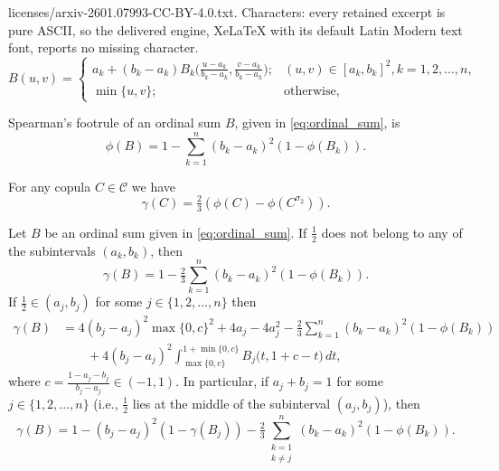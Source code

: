 \documentclass[10pt,a4paper]{amsart}
\newcommand{\CC}{\mathcal{C}}
\begin{document}
licenses/arxiv-2601.07993-CC-BY-4.0.txt. Characters: every retained excerpt is pure ASCII, so the delivered engine, XeLaTeX with its default Latin Modern text font, reports no missing character.
\begin{equation} \label{eq:ordinal_sum}
B(u, v) = \begin{cases}
		a_k + (b_k-a_k)B_k\big(\frac{u-a_k}{b_k-a_k}, \frac{v-a_k}{b_k-a_k}\big); & (u, v) \in [a_k, b_k]^2, k=1, 2, \dots, n,\\
			\min\{u,v\}; & \text{otherwise},
    \end{cases}
\end{equation}

\begin{proposition}\label{prop:ordinal-phi}
   Spearman's footrule of an ordinal sum $B$, given in \eqref{eq:ordinal_sum}, is
    \begin{equation} \label{eq:ordinal-phi}
        \phi(B) =  1 - \sum_{k=1}^n (b_k-a_k)^2(1-\phi(B_k)). 
    \end{equation}  
\end{proposition}

\begin{lemma} \label{lem:gamma-phi}
For any copula $C \in \CC$ we have 
$$\gamma(C) = \tfrac23 (\phi(C)-\phi(C^{\sigma_2})).$$
\end{lemma}

\begin{proposition}\label{prop:ordinal-gamma}
Let $B$ be an ordinal sum given in \eqref{eq:ordinal_sum}. If $\tfrac12$ does not belong to any of the subintervals $(a_k, b_k)$, then 
\begin{equation} \label{eq:ordinal-gamma-1}
        \gamma(B) =  1 - \tfrac23\sum_{k=1}^n (b_k-a_k)^2(1-\phi(B_k)). 
\end{equation}  
If $\tfrac12 \in (a_j, b_j)$ for some $j \in \{1, 2, ..., n\}$ then
\begin{align*}
   \gamma(B) &= 4(b_j-a_j)^2\max\{0,c\}^2 + 4a_j - 4a_j^2 - \tfrac23\sum_{k=1}^n (b_k-a_k)^2(1-\phi(B_k)) \\
   &\qquad+ 4(b_j-a_j)^2\int_{\max\{0,c\}}^{1+\min\{0,c\}} B_j\big(t,1+c-t\big) \, dt,
\end{align*}
where $c=\frac{1-a_j-b_j}{b_j-a_j} \in (-1,1)$.
In particular, if $a_j + b_j = 1$ for some $j \in \{1, 2, ..., n\}$ (i.e., $\tfrac12$ lies at the middle of the subinterval $(a_j, b_j)$), then
\begin{equation} \label{eq:ordinal-gamma-3}
        \gamma(B) =  1 - (b_j-a_j)^2(1-\gamma(B_j)) - \tfrac23\sum_{\substack{k=1 \\ k\ne j}}^n (b_k-a_k)^2(1-\phi(B_k)). 
\end{equation}  
\end{proposition}
\end{document}
